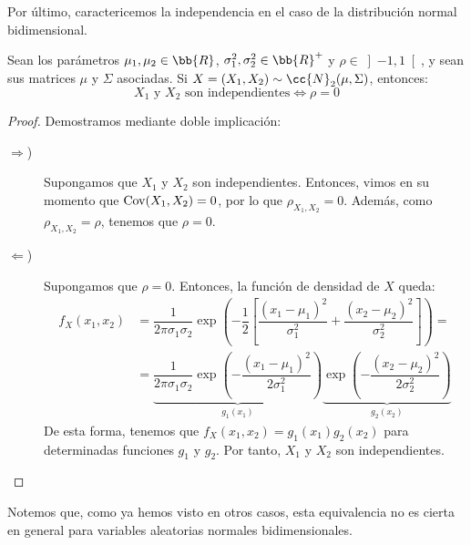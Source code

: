 Por último, caractericemos la independencia en el caso de la distribución normal bidimensional.
\begin{prop}\label{prop:independencia_normal_bidimensional}
    Sean los parámetros $\mu_1, \mu_2\in \bb{R}$, $\sigma_1^2, \sigma_2^2\in \bb{R}^+$ y $\rho\in \left]-1,1\right[$, y sean sus matrices $\mu$ y $\Sigma$ asociadas.
    Si $X=(X_1, X_2)\sim \cc{N}_2(\mu, \Sigma)$, entonces:
    \begin{equation*}
        X_1\text{ y }X_2\text{ son independientes}\iff \rho=0
    \end{equation*}
\end{prop}
\begin{proof}
    Demostramos mediante doble implicación:
    \begin{description}
        \item[$\Longrightarrow$)] Supongamos que $X_1$ y $X_2$ son independientes. Entonces, vimos en su momento que $\operatorname{Cov}(X_1, X_2)=0$, por lo que $\rho_{X_1, X_2}=0$. Además, como $\rho_{X_1, X_2}=\rho$, tenemos que $\rho=0$.
        
        \item[$\Longleftarrow$)] Supongamos que $\rho=0$. Entonces, la función de densidad de $X$ queda:
        \begin{align*}
            f_X(x_1,x_2)&=\dfrac{1}{2\pi\sigma_1\sigma_2}\exp\left(-\dfrac{1}{2}\left[\dfrac{(x_1-\mu_1)^2}{\sigma_1^2}+\dfrac{(x_2-\mu_2)^2}{\sigma_2^2}\right]\right)
            =\\&= \underbrace{\dfrac{1}{2\pi\sigma_1\sigma_2}\exp\left(-\dfrac{(x_1-\mu_1)^2}{2\sigma_1^2}\right)}_{g_1(x_1)}\underbrace{\exp\left(-\dfrac{(x_2-\mu_2)^2}{2\sigma_2^2}\right)}_{g_2(x_2)}
        \end{align*}
        De esta forma, tenemos que $f_X(x_1,x_2)=g_1(x_1)g_2(x_2)$ para determinadas funciones $g_1$ y $g_2$. Por tanto, $X_1$ y $X_2$ son independientes.
    \end{description}
\end{proof}
Notemos que, como ya hemos visto en otros casos, esta equivalencia no es cierta en general para variables aleatorias normales bidimensionales.